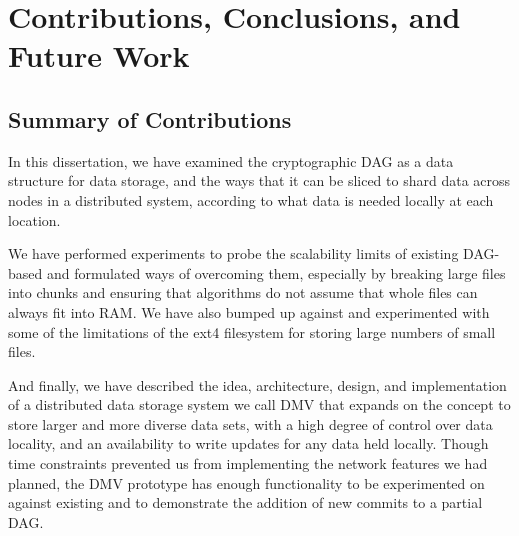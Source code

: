 \chapter{Contributions, Conclusions, and Future Work}


\section{Summary of Contributions}

In this dissertation, we have examined the cryptographic \acrfull{DAG} as a data
structure for data storage, and the ways that it can be sliced to shard data
across nodes in a distributed system, according to what data is needed locally
at each location.

We have performed experiments to probe the scalability limits of existing
\gls{DAG}-based  and formulated ways of overcoming them,
especially by breaking large files into chunks and ensuring that algorithms do
not assume that whole files can always fit into RAM. We have also bumped up
against and experimented with
some of the limitations of the ext4 filesystem for
storing large numbers of small files.

And finally, we have described the idea, architecture, design, and
implementation of a distributed data storage system we call \gls{DMV} that
expands on the  concept to store
larger and more diverse data sets, with a high degree of control over data
locality, and an availability to write updates for any data held locally. Though
time constraints prevented us from implementing the network features we had
planned, the \gls{DMV} prototype has enough functionality to be experimented on
against existing  and to demonstrate the addition of new
\glspl{commit} to a partial \gls{DAG}.
